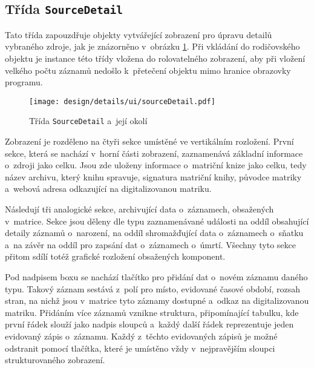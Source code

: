 		\subsection*{Třída \texttt{SourceDetail}}
		Tato třída zapouzdřuje objekty vytvářející zobrazení pro úpravu detailů vybraného zdroje, jak je znázorněno v~obrázku \ref{fig:designDetailSourceDetail}. Při vkládání do rodičovského objektu je instance této třídy vložena do rolovatelného zobrazení, aby při vložení velkého počtu záznamů nedošlo k~přetečení objektu mimo hranice obrazovky programu. \par
		\begin{figure}[h]
			\centering
			\texttt{[image: design/details/ui/sourceDetail.pdf]}
			\caption{Třída \texttt{SourceDetail} a~její okolí}
			\label{fig:designDetailSourceDetail}
		\end{figure}
		Zobrazení je rozděleno na čtyři sekce umístěné ve vertikálním rozložení. První sekce, která se nachází v~horní části zobrazení, zaznamenává základní informace o~zdroji jako celku. Jsou zde uloženy informace o~matriční knize jako celku, tedy název archivu, který knihu spravuje, signatura matriční knihy, původce matriky a~webová adresa odkazující na digitalizovanou matriku.\par
		Následují tři analogické sekce, archivující data o~záznamech, obsažených v~matrice. Sekce jsou děleny dle typu zaznamenávané události na oddíl obsahující detaily záznamů o~narození, na oddíl shromažďující data o~záznamech o~sňatku a~na závěr na oddíl pro zapsání dat o~záznamech o~úmrtí. Všechny tyto sekce přitom sdílí totéž grafické rozložení obsažených komponent.\par
		Pod nadpisem boxu se nachází tlačítko pro přidání dat o~novém záznamu daného typu. Takový záznam sestává z~polí pro místo, evidované časové období, rozsah stran, na nichž jsou v~matrice tyto záznamy dostupné a~odkaz na digitalizovanou matriku. Přidáním více záznamů vznikne struktura, připomínající tabulku, kde první řádek slouží jako nadpis sloupců a~každý další řádek reprezentuje jeden evidovaný zápis o~záznamu. Každý z~těchto evidovaných zápisů je možné odstranit pomocí tlačítka, které je umístěno vždy v~nejpravějším sloupci strukturovaného zobrazení.\par
		
